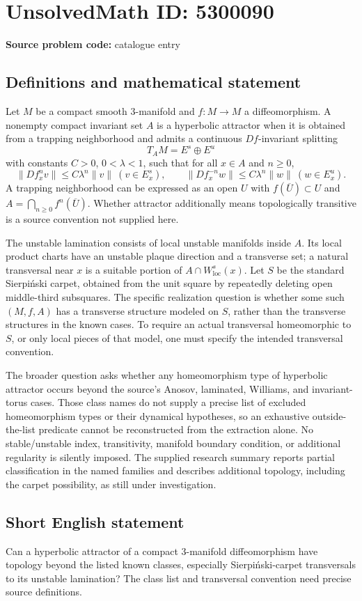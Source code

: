 \documentclass[11pt]{article}
\begin{document}
\section*{UnsolvedMath ID: 5300090}
\textbf{Source problem code:} catalogue entry
\subsection{Definitions and mathematical statement}
Let \(M\) be a compact smooth \(3\)-manifold and \(f:M\to M\) a diffeomorphism. A nonempty compact invariant set \(A\) is a hyperbolic attractor when it is obtained from a trapping neighborhood and admits a continuous \(Df\)-invariant splitting
\[
T_AM=E^s\oplus E^u
\]
with constants \(C>0\), \(0<\lambda<1\), such that for all \(x\in A\) and \(n\ge0\),
\[
\|Df_x^n v\|\le C\lambda^n\|v\|\ (v\in E_x^s),\qquad
\|Df_x^{-n}w\|\le C\lambda^n\|w\|\ (w\in E_x^u).
\]
A trapping neighborhood can be expressed as an open \(U\) with \(f(\overline U)\subset U\) and \(A=\bigcap_{n\ge0}f^n(\overline U)\). Whether attractor additionally means topologically transitive is a source convention not supplied here.

The unstable lamination consists of local unstable manifolds inside \(A\). Its local product charts have an unstable plaque direction and a transverse set; a natural transversal near \(x\) is a suitable portion of \(A\cap W^s_{\mathrm{loc}}(x)\). Let \(S\) be the standard Sierpiński carpet, obtained from the unit square by repeatedly deleting open middle-third subsquares. The specific realization question is whether some such \((M,f,A)\) has a transverse structure modeled on \(S\), rather than the transverse structures in the known cases. To require an actual transversal homeomorphic to \(S\), or only local pieces of that model, one must specify the intended transversal convention.

The broader question asks whether any homeomorphism type of hyperbolic attractor occurs beyond the source's Anosov, laminated, Williams, and invariant-torus cases. Those class names do not supply a precise list of excluded homeomorphism types or their dynamical hypotheses, so an exhaustive outside-the-list predicate cannot be reconstructed from the extraction alone. No stable/unstable index, transitivity, manifold boundary condition, or additional regularity is silently imposed. The supplied research summary reports partial classification in the named families and describes additional topology, including the carpet possibility, as still under investigation.
\subsection{Short English statement}
Can a hyperbolic attractor of a compact \(3\)-manifold diffeomorphism have topology beyond the listed known classes, especially Sierpiński-carpet transversals to its unstable lamination? The class list and transversal convention need precise source definitions.
\end{document}
